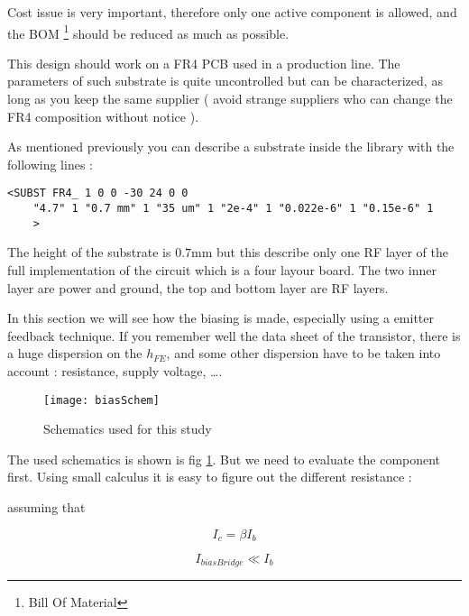 Cost issue is very important, therefore only one active component is allowed, and the BOM \footnote{Bill Of Material} should be reduced as much as possible.

\bigskip

This design should work on a FR4 PCB used in a production line. The parameters of such substrate is quite uncontrolled but can be characterized, as long as you keep the same supplier ( avoid strange suppliers who can change the FR4 composition without notice ).

As mentioned previously you can describe a substrate inside the library with the following lines :

\begin{verbatim}
<SUBST FR4_ 1 0 0 -30 24 0 0 
	"4.7" 1 "0.7 mm" 1 "35 um" 1 "2e-4" 1 "0.022e-6" 1 "0.15e-6" 1
	>
\end{verbatim}

The height of the substrate is $0.7$mm but this describe only one RF layer of the full implementation of the circuit which is a four layour board. The two inner layer are power and ground, the top and bottom layer are RF layers.



In this section we will see how the biasing is made, especially using a emitter feedback technique. If you remember well the data sheet of the transistor, there is a huge dispersion on the $h_{FE}$, and some other dispersion have to be taken into account : resistance, supply voltage, \ldots.

\begin{figure}[htbp]
\begin{center}
	\texttt{[image: biasSchem]}
	\caption{Schematics used for this study}
	\label{design:pa:bias:schema}
\end{center}
\end{figure}

The used schematics is shown is fig \ref{design:pa:bias:schema}. But we need to evaluate the component first. Using small calculus it is easy to figure out the different resistance :

assuming that 

\begin{equation}
I_c = \beta I_b 
\end{equation}

\begin{equation}
I_{biasBridge} \ll I_b
\end{equation}

